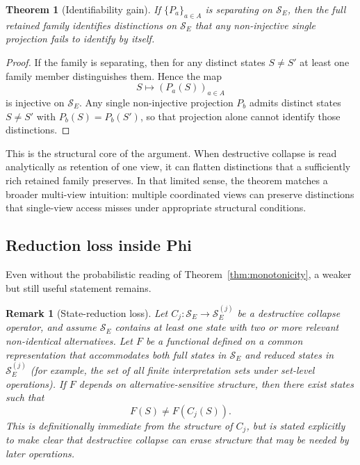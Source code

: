 \documentclass[11pt,a4paper]{article}
\newtheorem{theorem}{Theorem}
\newtheorem{remark}{Remark}
\begin{document}
\begin{theorem}[Identifiability gain]
\label{thm:ident}
If $\{P_a\}_{a \in A}$ is separating on $\mathcal{S}_E$, then the full retained family identifies distinctions on $\mathcal{S}_E$ that any non-injective single projection fails to identify by itself.
\end{theorem}

\begin{proof}
If the family is separating, then for any distinct states $S \neq S'$ at least one family member distinguishes them. Hence the map
\begin{equation}
S \mapsto (P_a(S))_{a \in A}
\end{equation}
is injective on $\mathcal{S}_E$. Any single non-injective projection $P_b$ admits distinct states $S \neq S'$ with $P_b(S)=P_b(S')$, so that projection alone cannot identify those distinctions.
\end{proof}

This is the structural core of the argument. When destructive collapse is read analytically as retention of one view, it can flatten distinctions that a sufficiently rich retained family preserves. In that limited sense, the theorem matches a broader multi-view intuition: multiple coordinated views can preserve distinctions that single-view access misses under appropriate structural conditions.

\subsection{Reduction loss inside Phi}

Even without the probabilistic reading of Theorem~\ref{thm:monotonicity}, a weaker but still useful statement remains.

\begin{remark}[State-reduction loss]
\label{rem:reduction}
Let $C_j : \mathcal{S}_E \to \mathcal{S}_E^{(j)}$ be a destructive collapse operator, and assume $\mathcal{S}_E$ contains at least one state with two or more relevant non-identical alternatives. Let $F$ be a functional defined on a common representation that accommodates both full states in $\mathcal{S}_E$ and reduced states in $\mathcal{S}_E^{(j)}$ (for example, the set of all finite interpretation sets under set-level operations). If $F$ depends on alternative-sensitive structure, then there exist states such that
\begin{equation}
F(S) \neq F(C_j(S)).
\end{equation}
This is definitionally immediate from the structure of $C_j$, but is stated explicitly to make clear that destructive collapse can erase structure that may be needed by later operations.
\end{remark}
\end{document}
